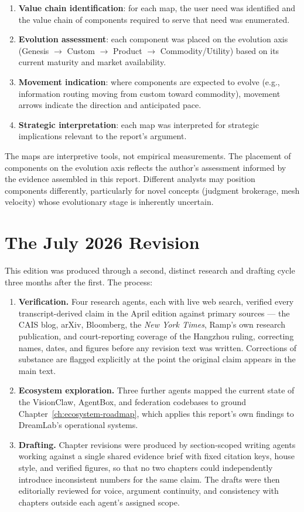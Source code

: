 \begin{enumerate}
  \item \textbf{Value chain identification}: for each map, the user need was identified and the value chain of components required to serve that need was enumerated.
  \item \textbf{Evolution assessment}: each component was placed on the evolution axis (Genesis $\rightarrow$ Custom $\rightarrow$ Product $\rightarrow$ Commodity/Utility) based on its current maturity and market availability.
  \item \textbf{Movement indication}: where components are expected to evolve (e.g., information routing moving from custom toward commodity), movement arrows indicate the direction and anticipated pace.
  \item \textbf{Strategic interpretation}: each map was interpreted for strategic implications relevant to the report's argument.
\end{enumerate}

The maps are interpretive tools, not empirical measurements. The placement of components on the evolution axis reflects the author's assessment informed by the evidence assembled in this report. Different analysts may position components differently, particularly for novel concepts (judgment brokerage, mesh velocity) whose evolutionary stage is inherently uncertain.

\section{The July 2026 Revision}

This edition was produced through a second, distinct research and drafting cycle three months after the first. The process:

\begin{enumerate}
  \item \textbf{Verification.} Four research agents, each with live web search, verified every transcript-derived claim in the April edition against primary sources --- the CAIS blog, arXiv, Bloomberg, the \emph{New York Times}, Ramp's own research publication, and court-reporting coverage of the Hangzhou ruling, correcting names, dates, and figures before any revision text was written. Corrections of substance are flagged explicitly at the point the original claim appears in the main text.
  \item \textbf{Ecosystem exploration.} Three further agents mapped the current state of the VisionClaw, AgentBox, and federation codebases to ground Chapter~\ref{ch:ecosystem-roadmap}, which applies this report's own findings to DreamLab's operational systems.
  \item \textbf{Drafting.} Chapter revisions were produced by section-scoped writing agents working against a single shared evidence brief with fixed citation keys, house style, and verified figures, so that no two chapters could independently introduce inconsistent numbers for the same claim. The drafts were then editorially reviewed for voice, argument continuity, and consistency with chapters outside each agent's assigned scope.
\end{enumerate}

